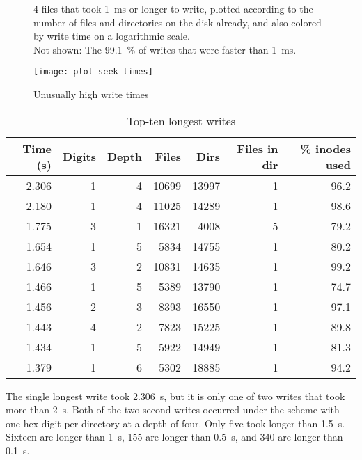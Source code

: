 \begin{figure}[]
    \caption{Unusually high write times}
    \label{plot-seek-times}
    \centering

    \SI{4}{\kib} files that took \SI{1}{\ms} or longer to write, plotted
    according to the number of files and directories on the disk already, and
    also colored by write time on a logarithmic scale. \\
    Not shown: The \SI{99.1}{\percent} of writes that were faster than
    \SI{1}{\ms}.

    \texttt{[image: plot-seek-times]}
\end{figure}

\begin{table}
    \caption{Top-ten longest writes}
    \label{longest-writes}
    \begin{tabular}{r r r r r r r}
        Time (\si{\s}) & Digits & Depth & Files & Dirs & Files in dir & \% inodes used \\
        \midrule
2.306 & 1 & 4 & 10699 & 13997 &  1 & 96.2 \\
2.180 & 1 & 4 & 11025 & 14289 &  1 & 98.6 \\
1.775 & 3 & 1 & 16321 &  4008 &  5 & 79.2 \\
1.654 & 1 & 5 &  5834 & 14755 &  1 & 80.2 \\
1.646 & 3 & 2 & 10831 & 14635 &  1 & 99.2 \\
1.466 & 1 & 5 &  5389 & 13790 &  1 & 74.7 \\
1.456 & 2 & 3 &  8393 & 16550 &  1 & 97.1 \\
1.443 & 4 & 2 &  7823 & 15225 &  1 & 89.8 \\
1.434 & 1 & 5 &  5922 & 14949 &  1 & 81.3 \\
1.379 & 1 & 6 &  5302 & 18885 &  1 & 94.2 \\
    \end{tabular}
\end{table}

The single longest write took \SI{2.306}{\s}, but it is only one of two writes
that took more than \SI{2}{\s}. Both of the two-second writes occurred under the
scheme with one hex digit per directory at a depth of four. Only five took
longer than \SI{1.5}{\s}. Sixteen are longer than \SI{1}{\s}, \num{155} are
longer than \SI{0.5}{\s}, and \num{340} are longer than \SI{0.1}{\s}.

